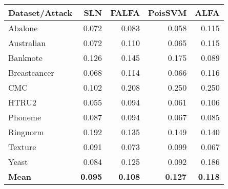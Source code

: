 \begin{table}[h]
    \footnotesize
    \centering
    \caption{}
    \begin{tabular}{l|rr|rr}
        \toprule
        Dataset/Attack &   SLN &  FALFA &  PoisSVM &  ALFA \\
        \midrule                                             
               Abalone & 0.072 &  0.083 &    0.058 & 0.115 \\
            Australian & 0.072 &  0.110 &    0.065 & 0.115 \\
              Banknote & 0.126 &  0.145 &    0.175 & 0.089 \\
          Breastcancer & 0.068 &  0.114 &    0.066 & 0.116 \\
                   CMC & 0.102 &  0.208 &    0.250 & 0.250 \\
                 HTRU2 & 0.055 &  0.094 &    0.061 & 0.106 \\
               Phoneme & 0.087 &  0.094 &    0.067 & 0.085 \\
              Ringnorm & 0.192 &  0.135 &    0.149 & 0.140 \\
               Texture & 0.091 &  0.073 &    0.099 & 0.067 \\
                 Yeast & 0.084 &  0.125 &    0.092 & 0.186 \\
        \midrule
        \textbf{Mean} & \textbf{0.095} & \textbf{0.108} & \textbf{0.127} & \textbf{0.118} \\
        \bottomrule
        \end{tabular}
    \label{table.real_rmse}
    \end{table}
